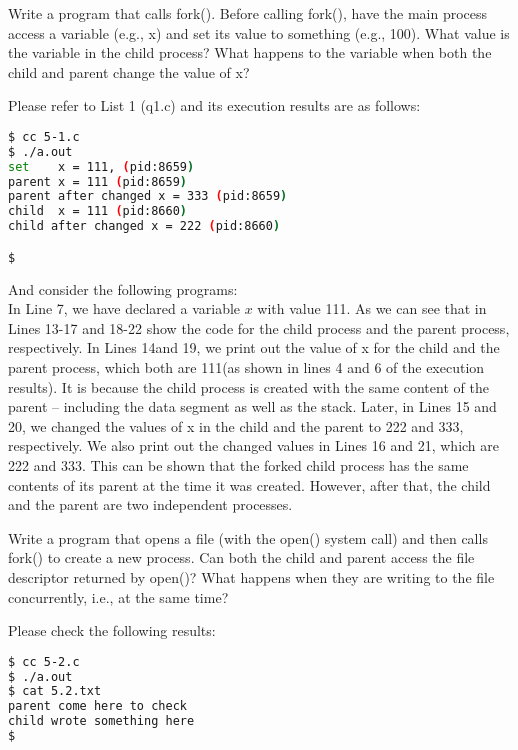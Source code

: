\documentclass[10pt, answers]{exam}
\begin{document}

\begin{questions} 
\setcounter{question}{0} 

\question 
Write a program that calls fork(). Before calling fork(), have the
main process access a variable (e.g., x) and set its value to something (e.g., 100). What value is the variable in the child process?
What happens to the variable when both the child and parent change
the value of x?

\begin{solution}
Please refer to List 1 (q1.c) and its execution results are as follows:

\begin{lstlisting}[language=bash]
$ cc 5-1.c
$ ./a.out
set    x = 111, (pid:8659)
parent x = 111 (pid:8659)
parent after changed x = 333 (pid:8659)
child  x = 111 (pid:8660)
child after changed x = 222 (pid:8660)

$
\end{lstlisting}

And consider the following programs:\\


In Line 7, we have declared a variable $x$ with value 111. As we can see that in Lines 13-17 and 18-22 show the code for the child process and the parent process, respectively. In Lines 14and 19, we print out the value of x for the child and the parent process, which both are 111(as shown in lines 4 and 6 of the execution results). It is because the child process is created with the same content of the parent -- including the data segment as well as the stack. Later, in Lines 15 and 20, we changed the values of x in the child and the parent to 222 and 333, respectively. We also print out the changed values in Lines 16 and 21, which are 222 and 333. This can be shown that the forked child process has the same contents of its parent at the time it was created. However, after that, the child and the parent are two independent processes.







\end{solution}


\question
Write a program that opens a file (with the open() system call) and then calls fork() to create a new process. Can both the child and parent access the file descriptor returned by open()? What happens when they are writing to the file concurrently, i.e., at the same time?
\begin{solution}
Please check the following results:
\begin{lstlisting}[language=bash]
$ cc 5-2.c
$ ./a.out
$ cat 5.2.txt
parent come here to check
child wrote something here
$
\end{lstlisting}
\end{solution}


\end{questions}
\end{document}
